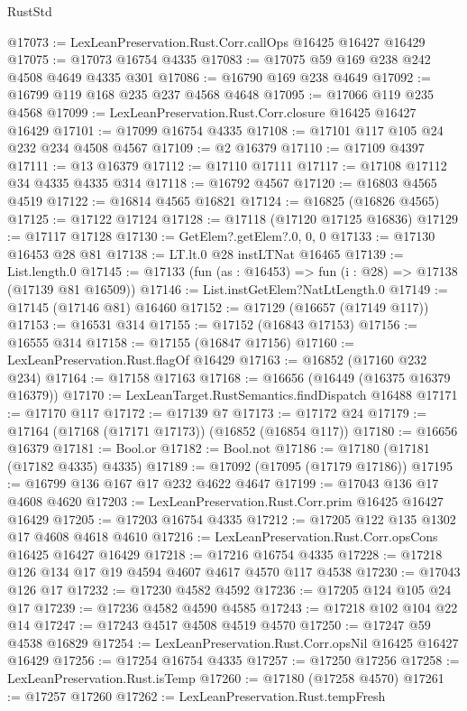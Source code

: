 \begin{lexlean}{RustStd}
\begin{coremodule}
@17073 := LexLeanPreservation.Rust.Corr.callOps @16425 @16427 @16429
@17075 := @17073 @16754 @4335
@17083 := @17075 @59 @169 @238 @242 @4508 @4649 @4335 @301
@17086 := @16790 @169 @238 @4649
@17092 := @16799 @119 @168 @235 @237 @4568 @4648
@17095 := @17066 @119 @235 @4568
@17099 := LexLeanPreservation.Rust.Corr.closure @16425 @16427 @16429
@17101 := @17099 @16754 @4335
@17108 := @17101 @117 @105 @24 @232 @234 @4508 @4567
@17109 := @2 @16379
@17110 := @17109 @4397
@17111 := @13 @16379
@17112 := @17110 @17111
@17117 := @17108 @17112 @34 @4335 @4335 @314
@17118 := @16792 @4567
@17120 := @16803 @4565 @4519
@17122 := @16814 @4565 @16821
@17124 := @16825 (@16826 @4565)
@17125 := @17122 @17124
@17128 := @17118 (@17120 @17125 @16836)
@17129 := @17117 @17128
@17130 := GetElem?.getElem?.{0, 0, 0}
@17133 := @17130 @16453 @28 @81
@17138 := LT.lt.{0} @28 instLTNat @16465
@17139 := List.length.{0}
@17145 := @17133 (fun (as : @16453) => fun (i : @28) => @17138 (@17139 @81 @16509))
@17146 := List.instGetElem?NatLtLength.{0}
@17149 := @17145 (@17146 @81) @16460
@17152 := @17129 (@16657 (@17149 @117))
@17153 := @16531 @314
@17155 := @17152 (@16843 @17153)
@17156 := @16555 @314
@17158 := @17155 (@16847 @17156)
@17160 := LexLeanPreservation.Rust.flagOf @16429
@17163 := @16852 (@17160 @232 @234)
@17164 := @17158 @17163
@17168 := @16656 (@16449 (@16375 @16379 @16379))
@17170 := LexLeanTarget.RustSemantics.findDispatch @16488
@17171 := @17170 @117
@17172 := @17139 @7
@17173 := @17172 @24
@17179 := @17164 (@17168 (@17171 @17173)) (@16852 (@16854 @117))
@17180 := @16656 @16379
@17181 := Bool.or
@17182 := Bool.not
@17186 := @17180 (@17181 (@17182 @4335) @4335)
@17189 := @17092 (@17095 (@17179 @17186))
@17195 := @16799 @136 @167 @17 @232 @4622 @4647
@17199 := @17043 @136 @17 @4608 @4620
@17203 := LexLeanPreservation.Rust.Corr.prim @16425 @16427 @16429
@17205 := @17203 @16754 @4335
@17212 := @17205 @122 @135 @1302 @17 @4608 @4618 @4610
@17216 := LexLeanPreservation.Rust.Corr.opsCons @16425 @16427 @16429
@17218 := @17216 @16754 @4335
@17228 := @17218 @126 @134 @17 @19 @4594 @4607 @4617 @4570 @117 @4538
@17230 := @17043 @126 @17
@17232 := @17230 @4582 @4592
@17236 := @17205 @124 @105 @24 @17
@17239 := @17236 @4582 @4590 @4585
@17243 := @17218 @102 @104 @22 @14
@17247 := @17243 @4517 @4508 @4519 @4570
@17250 := @17247 @59 @4538 @16829
@17254 := LexLeanPreservation.Rust.Corr.opsNil @16425 @16427 @16429
@17256 := @17254 @16754 @4335
@17257 := @17250 @17256
@17258 := LexLeanPreservation.Rust.isTemp
@17260 := @17180 (@17258 @4570)
@17261 := @17257 @17260
@17262 := LexLeanPreservation.Rust.tempFresh

\end{coremodule}
\end{lexlean}
